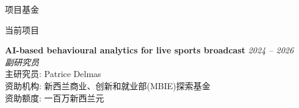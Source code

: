 \documentclass{resume} %
\begin{document}

\begin{rSection}{项目基金}
	\begin{rSubsection}{当前项目}{}{}{}
		\item {\bf AI-based behavioural analytics for live sports broadcast} \hfill {\em 2024 -- 2026}\\
			{\em 副研究员}\\
			主研究员: Patrice Delmas\\
			资助机构: 新西兰商业、创新和就业部(MBIE)探索基金\\
			资助额度: 一百万新西兰元
	\end{rSubsection}
\end{rSection}


\end{document}
